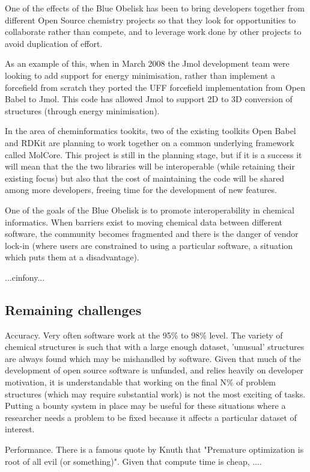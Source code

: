 \documentclass[10pt]{bmc_article}
\newenvironment{bmcformat}{\begin{raggedright}\baselineskip20pt\sloppy\setboolean{publ}{false}}{\end{raggedright}\baselineskip20pt\sloppy}
\begin{document}
\begin{bmcformat}
One of the effects of the Blue Obelisk has been to bring developers together from different Open Source chemistry projects so that they look for opportunities to collaborate rather than compete, and to leverage work done by other projects to avoid duplication of effort.

As an example of this, when in March 2008 the Jmol development team were looking to add support for energy minimisation, rather than implement a forcefield from scratch they ported the UFF forcefield implementation from Open Babel to Jmol. This code has allowed Jmol to support 2D to 3D conversion of structures (through energy minimisation).

In the area of cheminformatics tookits, two of the existing toolkits Open Babel and RDKit are planning to work together on a common underlying framework called MolCore. This project is still in the planning stage, but if it is a success it will mean that the the two libraries will be interoperable (while retaining their existing focus) but also that the cost of maintaining the code will be shared among more developers, freeing time for the development of new features.

One of the goals of the Blue Obelisk is to promote interoperability in chemical informatics. When barriers exist to moving chemical data between different software, the community becomes fragmented and there is the danger of vendor lock-in (where users are constrained to using a particular software, a situation which puts them at a disadvantage). 

...cinfony...

  \subsection*{Remaining challenges}

Accuracy. Very often software work at the 95\% to 98\% level. The variety of chemical structures is such that with a large enough dataset, 'unusual' structures are always found which may be mishandled by software. Given that much of the development of open source software is unfunded, and relies heavily on developer motivation, it is understandable that working on the final N\% of problem structures (which may require substantial work) is not the most exciting of tasks. Putting a bounty system in place may be useful for these situations where a researcher needs a problem to be fixed because it affects a particular dataset of interest.

Performance. There is a famous quote by Knuth that "Premature optimization is root of all evil (or something)". Given that compute time is cheap, ....


\end{bmcformat}
\end{document}

